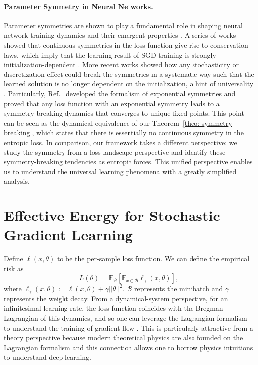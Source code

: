 \documentclass{article}
\theoremstyle{plain}
\newcommand{\E}{\mathbb{E}}
\begin{document}
\paragraph{Parameter Symmetry in Neural Networks.}
Parameter symmetries are shown to play a fundamental role in shaping neural network training dynamics and their emergent properties \citep{li2016symmetry, zhao2022symmetry, ziyin2024parameter, ziyin2024symmetry, ziyin2024remove,ziyin2025parameter}. A series of works showed that continuous symmetries in the loss function give rise to conservation laws, which imply that the learning result of SGD training is strongly initialization-dependent \cite{hidenori2021noether, zhao2022symmetry, marcotte2023abide}. More recent works showed how any stochasticity or discretization effect could break the symmetries in a systematic way such that the learned solution is no longer dependent on the initialization, a hint of universality
\citep{chen2023stochastic,ziyin2024parameter,ziyin2024symmetry,ziyin2025parameter}. Particularly, Ref.~\citep{ziyin2024parameter} developed the formalism of exponential symmetries and proved that any loss function with an exponential symmetry leads to a symmetry-breaking dynamics that converges to unique fixed points. This point can be seen as the dynamical equivalence of our Theorem~\ref{theo: symmetry breaking}, which states that there is essentially no continuous symmetry in the entropic loss. In comparison, our framework takes a different perspective: we study the symmetry from a loss landscape perspective and identify these symmetry-breaking tendencies as entropic forces. This unified perspective enables us to understand the universal learning phenomena with a greatly simplified analysis. 

\vspace{-2mm}
\section{Effective Energy for Stochastic Gradient Learning}\label{sec: entropic loss}
\vspace{-1mm}
Define $\ell(x,\theta)$ to be the per-sample loss function. We can define the empirical risk as 
\begin{equation}
    L(\theta) = \E_\mathcal{B}[\E_{x\in\mathcal{B}}\ell_\gamma(x,\theta)],
\end{equation}
where $\ell_\gamma(x,\theta):=\ell(x,\theta)+\gamma||\theta||^2$, $\mathcal{B}$ represents the minibatch and $\gamma$ represents the weight decay. From a dynamical-system perspective, for an infinitesimal learning rate, the loss function coincides with the Bregman Lagrangian of this dynamics, and so one can leverage the Lagrangian formalism to understand the training of gradient flow \cite{wibisono2016variational}. This is particularly attractive from a theory perspective because modern theoretical physics are also founded on the Lagrangian formalism and this connection allows one to borrow physics intuitions to understand deep learning.
\end{document}
